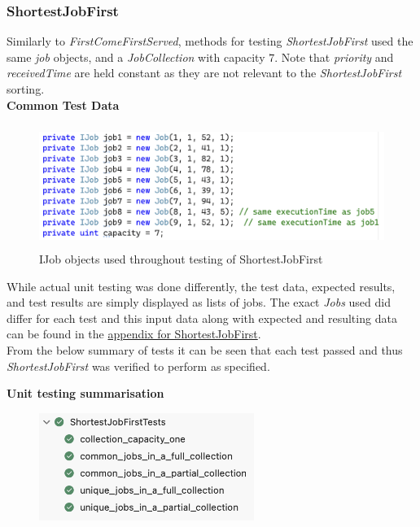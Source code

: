 \documentclass[a4paper]{article}
\begin{document}
\subsubsection{ShortestJobFirst}
Similarly to \textit{FirstComeFirstServed}, methods for testing \textit{ShortestJobFirst} used the same \textit{job} objects, and a \textit{JobCollection} with capacity $7$. Note that \textit{priority} and \textit{receivedTime} are held constant as they are not relevant to the \textit{ShortestJobFirst} sorting.
\\[6pt]
\textbf{Common Test Data}
\begin{figure}[H]
   \centering
   \includegraphics[height=4cm]{images/SJF-data.png}
   \caption{IJob objects used throughout testing of ShortestJobFirst}
\end{figure}
While actual unit testing was done differently, the test data, expected results, and test results are simply displayed as lists of jobs. The exact \textit{Jobs} used did differ for each test and this input data along with expected and resulting data can be found in the \hyperlink{subsubsection.5.3.1}{appendix for ShortestJobFirst}.
\\[3pt]
From the below summary of tests it can be seen that each test passed and thus \textit{ShortestJobFirst} was verified to perform as specified.

\textbf{Unit testing summarisation}
\begin{figure}[H]
   \includegraphics[height=3.5cm]{images/SJF-summary.png}
\end{figure}

\pagebreak
\end{document}
